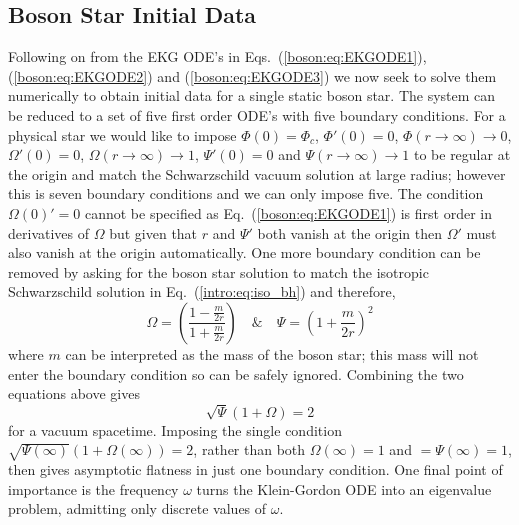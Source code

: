 \subsection{Boson Star Initial Data}

Following on from the EKG ODE's in Eqs.~(\ref{boson:eq:EKGODE1}),  (\ref{boson:eq:EKGODE2}) and (\ref{boson:eq:EKGODE3}) we now seek to solve them numerically to obtain initial data for a single static boson star. The system can be reduced to a set of five first order ODE's with five boundary conditions. For a physical star we would like to impose $\Phi(0) = \Phi_c$, $\Phi'(0)=0$, $\Phi(r\rightarrow\infty)\rightarrow0$, $\Omega'(0)=0$, $\Omega(r\rightarrow\infty)\rightarrow1$, $\Psi'(0)=0$ and $\Psi(r\rightarrow\infty)\rightarrow1$ to be regular at the origin and match the Schwarzschild vacuum solution at large radius; however this is seven boundary conditions and we can only impose five. The condition $\Omega(0)'=0$ cannot be specified as Eq.~(\ref{boson:eq:EKGODE1}) is first order in derivatives of $\Omega$ but given that $r$ and $\Psi'$ both vanish at the origin then $\Omega'$ must also vanish at the origin automatically. One more boundary condition can be removed by asking for the boson star solution to match the isotropic Schwarzschild solution in Eq.~(\ref{intro:eq:iso_bh}) and therefore,
\begin{equation}
\Omega = \left(\frac{1-\frac{m}{2r}}{1+\frac{m}{2r}}\right) \quad \& \quad \Psi = \left( 1+\frac{m}{2r}\right)^2 \end{equation} 
where $m$ can be interpreted as the mass of the boson star; this mass will not enter the boundary condition so can be safely ignored. Combining the two equations above gives
\begin{equation} 
\sqrt{\Psi}\left(1+\Omega\right) = 2
\end{equation}
for a vacuum spacetime. Imposing the single condition $\sqrt{\Psi(\infty)}\left(1+\Omega(\infty)\right)=2$, rather than both $\Omega(\infty)=1$ and $=\Psi(\infty)=1$, then gives asymptotic flatness in just one boundary condition. One final point of importance is the frequency $\omega$ turns the Klein-Gordon ODE into an eigenvalue problem, admitting only discrete values of $\omega$. 

